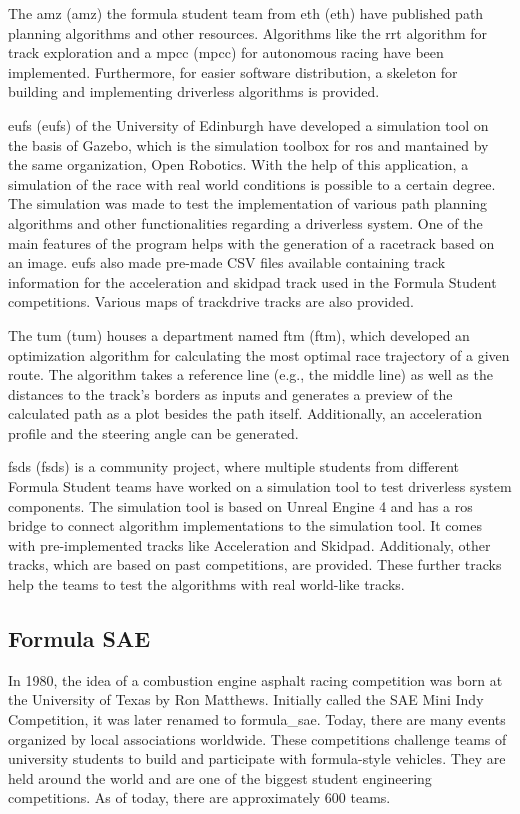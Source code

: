 The \acrshort{amz} (\acrlong{amz}) the formula student team from \acrshort{eth} (\acrlong{eth}) have published path planning algorithms and other resources. Algorithms like the \acrshort{rrt} algorithm for track exploration and a \acrlong{mpcc} (\acrshort{mpcc}) for autonomous racing have been implemented. Furthermore, for easier software distribution, a skeleton for building and implementing driverless algorithms is provided.
\cite{amz_racing_github}

\acrlong{eufs} (\acrshort{eufs}) of the University of Edinburgh have developed a simulation tool on the basis of Gazebo, which is the simulation toolbox for \acrshort{ros} and mantained by the same organization, Open Robotics. With the help of this application, a simulation of the race with real world conditions is possible to a certain degree. The simulation was made to test the implementation of various path planning algorithms and other functionalities regarding a driverless system. One of the main features of the program helps with the generation of a racetrack based on an image. \acrshort{eufs} also made pre-made CSV files available containing track information for the acceleration and skidpad track used in the Formula Student competitions. Various maps of trackdrive tracks are also provided.
\cite{eufs_sim_gitlab}

The \acrlong{tum} (\acrshort{tum}) houses a department named \acrlong{ftm} (\acrshort{ftm}), which developed an optimization algorithm for calculating the most optimal race trajectory of a given route. The algorithm takes a reference line (e.g., the middle line) as well as the distances to the track's borders as inputs and generates a preview of the calculated path as a plot besides the path itself. Additionally, an acceleration profile and the steering angle can be generated.
\cite{tumftm_optimization_algoritm}

\acrlong{fsds} (\acrshort{fsds}) is a community project, where multiple students from different Formula Student teams have worked on a simulation tool to test driverless system components. The simulation tool is based on Unreal Engine 4 \cite{unreal_engine} and has a \acrshort{ros} bridge to connect algorithm implementations to the simulation tool. It comes with pre-implemented tracks like Acceleration and Skidpad. Additionaly, other tracks, which are based on past competitions, are provided. These further tracks help the teams to test the algorithms with real world-like tracks.
\cite{fsds_github}

\subsection{Formula SAE}
In 1980, the idea of a combustion engine asphalt racing competition was born at the University of Texas by Ron Matthews. Initially called the SAE Mini Indy Competition, it was later renamed to \Gls{formula_sae}. Today, there are many events organized by local associations worldwide.
\cite{formula_sae}
These competitions challenge teams of university students to build and participate with formula-style vehicles. They are held around the world and are one of the biggest student engineering competitions. As of today, there are approximately 600 teams. \cite{sae_student_events}

